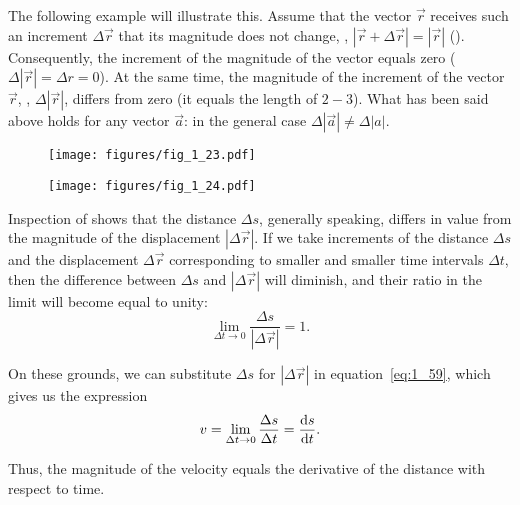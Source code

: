 \noindent
The following example will illustrate this. Assume that the vector $\vec{r}$ receives such an increment $\Delta\vec{r}$ that its magnitude does not change, \ie, $|\vec{r}+\Delta\vec{r}|=|\vec{r}|$ (). Consequently, the increment of the magnitude of the vector equals zero ($\Delta|\vec{r}| = \Delta r = 0$). At the same time, the magnitude of the increment of the vector $\vec{r}$, \ie, $\Delta|\vec{r}|$, differs from zero (it equals the length of $2-3$). What has been said above holds for any vector $\vec{a}$: in the general case $\Delta|\vec{a}|\neq\Delta|a|$.

\begin{figure}[t]
	\begin{minipage}[t]{0.5\linewidth}
		\begin{center}
			\texttt{[image: figures/fig\_1\_23.pdf]}
			\caption[]{}
			\label{fig:1_23}
		\end{center}
	\end{minipage}
	\hfill{ }%
	\begin{minipage}[t]{0.5\linewidth}
		\begin{center}
			\texttt{[image: figures/fig\_1\_24.pdf]}
			\caption[]{}
			\label{fig:1_24}
		\end{center}
	\end{minipage}
\vspace{-0.7cm}
\end{figure}

Inspection of  shows that the distance $\Delta s$, generally speaking, differs in value from the magnitude of the displacement $|\Delta\vec{r}|$. If we take increments of the distance $\Delta s$ and the displacement $\Delta\vec{r}$ corresponding to smaller and smaller time intervals $\Delta t$, then the difference between $\Delta s$ and $|\Delta\vec{r}|$ will diminish, and their ratio in the limit will become equal to unity:
\begin{equation*}
\lim_{\Delta t\to 0} \frac{\Delta s}{|\Delta\vec{r}|} = 1. 
\end{equation*}

\noindent
On these grounds, we can substitute $\Delta s$ for $|\Delta\vec{r}|$ in equation~\eqref{eq:1_59}, which gives us the expression
\begin{equation}\label{eq:1_60}
v = \lim_{\Delta t\to 0} \frac{\Delta s}{\Delta t} = \frac{\mathrm{d} s}{\mathrm{d} t}. 
\end{equation}

\noindent
Thus, the magnitude of the velocity equals the derivative of the distance with respect to time.

